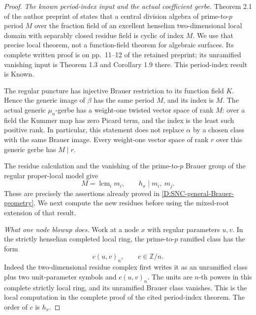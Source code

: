 \begin{proof}
\emph{The known period-index input and the actual coefficient
gerbe.}
Theorem 2.1 of the author preprint of
\citet{C_CTOP2000LocalPeriodIndex} states that a central
division algebra of prime-to-\(p\) period \(M\) over the
fraction field of an excellent henselian two-dimensional
local domain with separably closed residue field is
cyclic of index \(M\). We use that precise local
theorem, not a function-field theorem for algebraic
surfaces. Its complete written proof is on pp.~11--12
of the retained preprint; its unramified vanishing
input is Theorem 1.3 and Corollary 1.9 there.
This period-index result is Known.

The regular puncture has injective Brauer restriction
to its function field \(K\). Hence the generic image
of \(\beta\) has the same period \(M\), and its index
is \(M\). The actual generic \(\mu_n\)-gerbe has a
weight-one twisted vector space of rank \(M\):
over a field the Kummer map has zero Picard term,
and the index is the least such positive rank.
In particular, this statement does not replace
\(\alpha\) by a chosen class with the same Brauer image.
Every weight-one vector space of rank \(r\) over this
generic gerbe has \(M\mid r\).

The residue calculation and the vanishing of the
prime-to-\(p\) Brauer group of the regular proper-local
model give
\[
           M=\operatorname{lcm}_i m_i,\qquad
           h_x\mid m_i,\ m_j.                         \tag{D.RA.2}
\]
These are precisely the assertions already proved in
\ref{D:SNC-general-Brauer-geometry}.
We next compute the new residues before using the
mixed-root extension of that result.

\emph{What one node blowup does.}
Work at a node \(x\) with regular parameters \(u,v\).
In the strictly henselian completed local ring, the
prime-to-\(p\) ramified class has the form
\[
                         c(u,v)_n,\qquad c\in\mathbb Z/n.
                                                        \tag{D.RA.3}
\]
Indeed the two-dimensional residue complex first
writes it as an unramified class plus two
unit-parameter symbols and \(c(u,v)_n\).
The units are \(n\)-th powers in this complete
strictly local ring, and its unramified Brauer class
vanishes. This is the local computation in the
complete proof of the cited period-index theorem.
The order of \(c\) is \(h_x\).


\end{proof}
